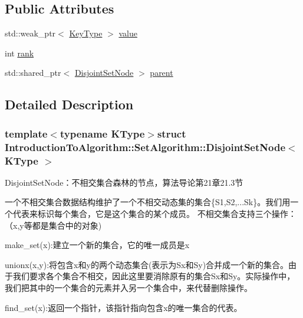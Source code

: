 \subsection*{Public Attributes}
\begin{DoxyCompactItemize}
\item 
std\+::weak\+\_\+ptr$<$ \hyperlink{struct_introduction_to_algorithm_1_1_set_algorithm_1_1_disjoint_set_node_a8f801679de129d80a99ad683430c534a}{Key\+Type} $>$ \hyperlink{struct_introduction_to_algorithm_1_1_set_algorithm_1_1_disjoint_set_node_ae01535aa5e8ba05dceedd5c475d61c18}{value}
\item 
int \hyperlink{struct_introduction_to_algorithm_1_1_set_algorithm_1_1_disjoint_set_node_a1fd137f74ca1317bfb02d9e1640ce147}{rank}
\item 
std\+::shared\+\_\+ptr$<$ \hyperlink{struct_introduction_to_algorithm_1_1_set_algorithm_1_1_disjoint_set_node}{Disjoint\+Set\+Node} $>$ \hyperlink{struct_introduction_to_algorithm_1_1_set_algorithm_1_1_disjoint_set_node_ad5cf3f4d739ecd0c1f6d3b3005e21993}{parent}
\end{DoxyCompactItemize}


\subsection{Detailed Description}
\subsubsection*{template$<$typename K\+Type$>$struct Introduction\+To\+Algorithm\+::\+Set\+Algorithm\+::\+Disjoint\+Set\+Node$<$ K\+Type $>$}

Disjoint\+Set\+Node：不相交集合森林的节点，算法导论第21章21.3节 

一个不相交集合数据结构维护了一个不相交动态集的集合\{S1,S2,...Sk\}。我们用一个代表来标识每个集合，它是这个集合的某个成员。 不相交集合支持三个操作：（x,y等都是集合中的对象)


\begin{DoxyItemize}
\item make\+\_\+set(x)\+:建立一个新的集合，它的唯一成员是x
\item unionx(x,y)\+:将包含x和y的两个动态集合(表示为\+Sx和\+Sy)合并成一个新的集合。由于我们要求各个集合不相交，因此这里要消除原有的集合\+Sx和\+Sy。实际操作中， 我们把其中的一个集合的元素并入另一个集合中，来代替删除操作。
\item find\+\_\+set(x)\+:返回一个指针，该指针指向包含x的唯一集合的代表。
\end{DoxyItemize}

